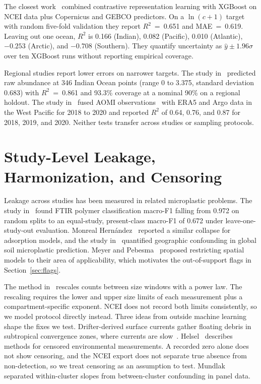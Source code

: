 \documentclass[12pt,a4paper]{report}
\newcommand{\Rsq}{$R^2$}
\begin{document}
The closest work~\cite{dalvi2026} combined contrastive representation learning with XGBoost on NCEI data plus Copernicus and GEBCO predictors. On a $\ln(c+1)$ target with random five-fold validation they report \Rsq{}~=~0.651 and MAE~=~0.619. Leaving out one ocean, \Rsq{} is 0.166 (Indian), 0.082 (Pacific), 0.010 (Atlantic), $-0.253$ (Arctic), and $-0.708$ (Southern). They quantify uncertainty as $\hat{y}\pm1.96\sigma$ over ten XGBoost runs without reporting empirical coverage.

Regional studies report lower errors on narrower targets. The study in~\cite{ali2026} predicted raw abundance at 346 Indian Ocean points (range 0 to 3.375, standard deviation 0.683) with \Rsq{}~=~0.861 and 93.3\% coverage at a nominal 90\% on a regional holdout. The study in~\cite{chan2026} fused AOMI observations~\cite{isobe2021} with ERA5 and Argo data in the West Pacific for 2018 to 2020 and reported \Rsq{} of 0.64, 0.76, and 0.87 for 2018, 2019, and 2020. Neither tests transfer across studies or sampling protocols.

\section{Study-Level Leakage, Harmonization, and Censoring}

Leakage across studies has been measured in related microplastic problems. The study in~\cite{khanam2026} found FTIR polymer classification macro-F1 falling from 0.972 on random splits to an equal-study, present-class macro-F1 of 0.672 under leave-one-study-out evaluation. Monreal Hern\'andez~\cite{monreal2026} reported a similar collapse for adsorption models, and the study in~\cite{mokeira2026} quantified geographic confounding in global soil microplastic prediction. Meyer and Pebesma~\cite{meyer2021} proposed restricting spatial models to their area of applicability, which motivates the out-of-support flags in Section~\ref{sec:flags}.

The method in~\cite{koelmans2020} rescales counts between size windows with a power law. The rescaling requires the lower and upper size limits of each measurement plus a compartment-specific exponent. NCEI does not record both limits consistently, so we model protocol directly instead. Three ideas from outside machine learning shape the fixes we test. Drifter-derived surface currents gather floating debris in subtropical convergence zones, where currents are slow~\cite{maximenko2012}. Helsel~\cite{helsel2012} describes methods for censored environmental measurements. A recorded zero alone does not show censoring, and the NCEI export does not separate true absence from non-detection, so we treat censoring as an assumption to test. Mundlak~\cite{mundlak1978} separated within-cluster slopes from between-cluster confounding in panel data.
\end{document}
